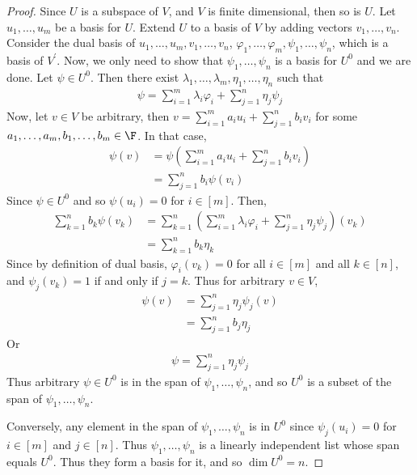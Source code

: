 \documentclass{article}
\begin{document}
  \begin{proof}
    Since $U$ is a subspace of $V$, and $V$ is finite dimensional, then so is $U$. Let $u_1, \dots, u_m$ be a basis for $U$. Extend $U$ to a basis of $V$ by adding vectors $v_1, \dots, v_n$.
    Consider the dual basis of $u_1, \dots, u_m, v_1, \dots, v_n$, $\varphi_1, \dots, \varphi_m, \psi_1, \dots, \psi_n$, which is a basis of $V^\prime$. Now, we only need to show that
    $\psi_1, \dots, \psi_n$ is a basis for $U^0$ and we are done. Let $\psi \in U^0$. Then there exist $\lambda_1, \dots, \lambda_m, \eta_1, \dots, \eta_n$ such that
    \begin{align*}
      \psi = \sum_{i = 1}^{m}\lambda_i\varphi_i + \sum_{j = 1}^{n}\eta_j\psi_j
    \end{align*}
    Now, let $v \in V$ be arbitrary, then $v = \sum_{i = 1}^{m}a_iu_i + \sum_{j = 1}^{n}b_iv_i$ for some $a_1, \dots, a_m, b_1, \dots, b_m \in \F$. In that case,
    \begin{align*}
      \psi(v) & = \psi(\sum_{i = 1}^{m}a_iu_i + \sum_{j = 1}^{n}b_iv_i) \\
      & = \sum_{j = 1}^{n}b_i\psi(v_i)
    \end{align*}
    Since $\psi \in U^0$ and so $\psi(u_i) = 0$ for $i \in [m]$. Then,
    \begin{align*}
      \sum_{k = 1}^{n}b_k\psi(v_k) & = \sum_{k = 1}^{n}(\sum_{i = 1}^{m}\lambda_i\varphi_i + \sum_{j = 1}^{n}\eta_j\psi_j)(v_k) \\
      & = \sum_{k = 1}^{n}b_k\eta_k
    \end{align*}
    Since by definition of dual basis, $\varphi_i(v_k) = 0$ for all $i \in [m]$ and all $k \in [n]$, and $\psi_j(v_k) = 1$ if and only if $j = k$. Thus for arbitrary $v \in V$,
    \begin{align*}
      \psi(v) & = \sum_{j = 1}^{n}\eta_j\psi_j(v) \\
      & = \sum_{j = 1}^{n}b_j\eta_j
    \end{align*}
    Or
    \begin{align*}
      \psi = \sum_{j = 1}^{n}\eta_j\psi_j
    \end{align*}
    Thus arbitrary $\psi \in U^0$ is in the span of $\psi_1, \dots, \psi_n$, and so $U^0$ is a subset of the span of $\psi_1, \dots, \psi_n$. 

    Conversely, any element in the span of $\psi_1, \dots, \psi_n$ is in $U^0$ since $\psi_j(u_i) = 0$ for $i \in [m]$ and $j \in [n]$. Thus $\psi_1, \dots, \psi_n$ is a linearly independent
    list whose span equals $U^0$. Thus they form a basis for it, and so $\dim U^0 = n$.

  \end{proof}
\end{document}
